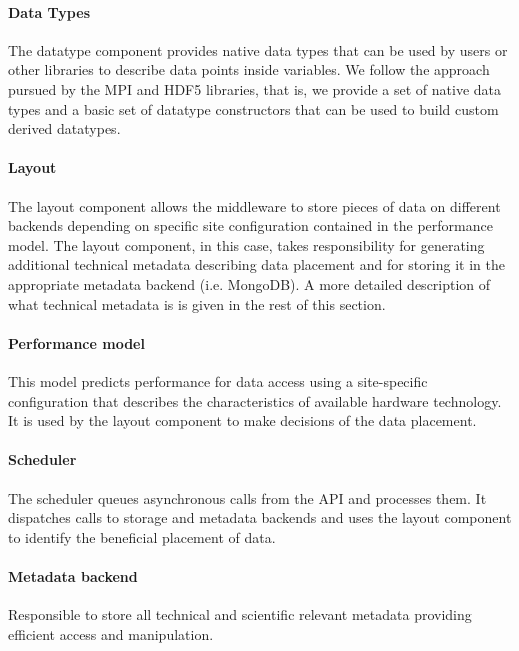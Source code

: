 \paragraph{Data Types}
The datatype component provides native data types that can be used by users or other libraries to describe data points inside variables.
We follow the approach pursued by the MPI and HDF5 libraries, that is, we provide a set of native data types and a basic set of datatype constructors that can be used to build custom derived datatypes.

\paragraph{Layout}
The layout component allows the middleware to store pieces of data on different backends depending on specific site configuration contained in the performance model.
The layout component, in this case, takes responsibility for generating additional technical metadata describing data placement and for storing it in the appropriate metadata backend (i.e. MongoDB).
A more detailed description of what technical metadata is is given in the rest of this section.

\paragraph{Performance model}
This model predicts performance for data access using a site-specific configuration that describes the characteristics of available hardware technology.
It is used by the layout component to make decisions of the data placement.

\paragraph{Scheduler}
The scheduler queues asynchronous calls from the API and processes them.
It dispatches calls to storage and metadata backends and uses the layout component to identify the beneficial placement of data.

\paragraph{Metadata backend}
Responsible to store all technical and scientific relevant metadata providing efficient access and manipulation.

